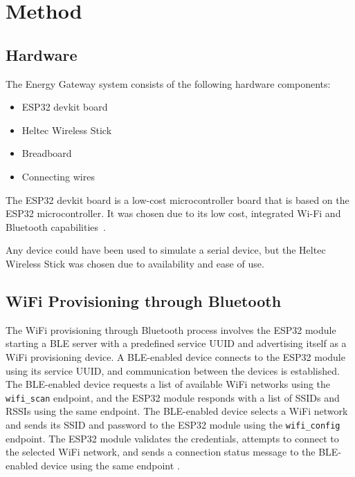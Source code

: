 \section{Method}\label{sec:method}

\subsection{Hardware}

The Energy Gateway system consists of the following hardware components:

\begin{itemize}
  \item ESP32 devkit board
  \item Heltec Wireless Stick
  \item Breadboard
  \item Connecting wires
\end{itemize}

The ESP32 devkit board is a low-cost microcontroller board that is based on the ESP32 microcontroller. It was chosen due to its low cost, integrated Wi-Fi and Bluetooth capabilities~\cite{platformio:esp32-devkitv1}.

Any device could have been used to simulate a serial device, but the Heltec Wireless Stick was chosen due to availability and ease of use.

\subsection{WiFi Provisioning through Bluetooth}

The WiFi provisioning through Bluetooth process involves the ESP32 module starting a BLE server with a predefined service UUID and advertising itself as a WiFi provisioning device. A BLE-enabled device connects to the ESP32 module using its service UUID, and communication between the devices is established. The BLE-enabled device requests a list of available WiFi networks using the \texttt{wifi\_scan} endpoint, and the ESP32 module responds with a list of SSIDs and RSSIs using the same endpoint. The BLE-enabled device selects a WiFi network and sends its SSID and password to the ESP32 module using the \texttt{wifi\_config} endpoint. The ESP32 module validates the credentials, attempts to connect to the selected WiFi network, and sends a connection status message to the BLE-enabled device using the same endpoint \cite{espressif:esp-idf-programming-guide}.

